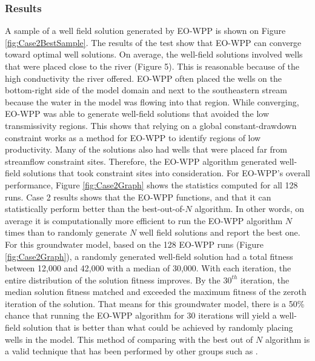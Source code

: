\documentclass[authoryear]{elsarticle}
\begin{document}
\subsubsection{Results}
A sample of a well field solution generated by EO-WPP is shown on Figure \ref{fig:Case2BestSample}. The results of the test show that EO-WPP can converge toward optimal well solutions. On average, the well-field solutions involved wells that were placed close to the river (Figure 5). This is reasonable because of the high conductivity the river offered. EO-WPP often placed the wells on the bottom-right side of the model domain and next to the southeastern stream because the water in the model was flowing into that region. While converging, EO-WPP was able to generate well-field solutions that avoided the low transmissivity regions. This shows that relying on a global constant-drawdown constraint works as a method for EO-WPP to identify regions of low productivity. Many of the solutions also had wells that were placed far from streamflow constraint sites. Therefore, the EO-WPP algorithm generated well-field solutions that took constraint sites into consideration. For EO-WPP’s overall performance, Figure \ref{fig:Case2Graph} shows the statistics computed for all 128 runs. Case 2 results shows that the EO-WPP functions, and that it can statistically perform better than the best-out-of-$N$ algorithm. In other words, on average it is computationally more efficient to run the EO-WPP algorithm $N$ times than to randomly generate $N$ well field solutions and report the best one. For this groundwater model, based on the 128 EO-WPP runs (Figure \ref{fig:Case2Graph}), a randomly generated well-field solution had a total fitness between 12,000 and 42,000 with a median of 30,000. With each iteration, the entire distribution of the solution fitness improves. By the $30^{th}$ iteration, the median solution fitness matched and exceeded the maximum fitness of the zeroth iteration of the solution. That means for this groundwater model, there is a 50\% chance that running the EO-WPP algorithm for 30 iterations will yield a well-field solution that is better than what could be achieved by randomly placing wells in the model. This method of comparing with the best out of $N$ algorithm is a valid technique that has been performed by other groups such as \cite{feng2012optimizing}.
\end{document}
